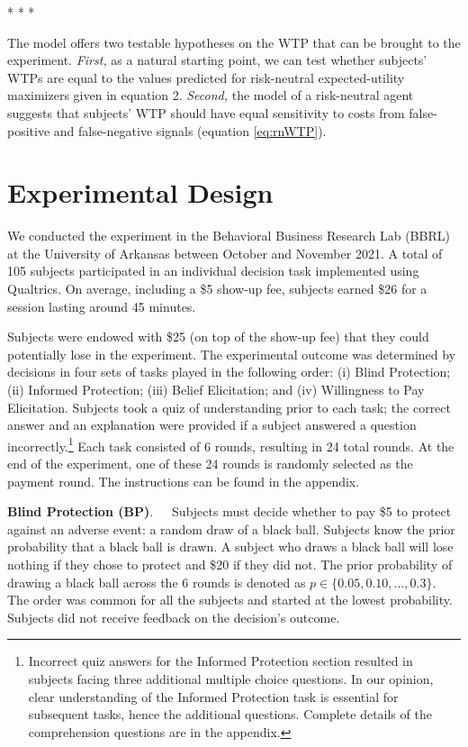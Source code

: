 \documentclass[12pt,a4paper]{article}
\begin{document}
\begin{center} * * * \end{center}
The model offers two testable hypotheses on the WTP that can be brought to the experiment. \emph{First,} as a natural starting point, we can test whether subjects' WTPs are equal to the values predicted for risk-neutral expected-utility maximizers given in equation 2. \emph{Second,} the model of a risk-neutral agent suggests that subjects' WTP should have equal sensitivity to costs from false-positive and false-negative signals (equation \ref{eq:rnWTP}). 



\section{Experimental Design}\label{sec:design}

We conducted the experiment in the Behavioral Business Research Lab (BBRL) at the University of Arkansas between October and November 2021.  A total of 105 subjects participated in an individual decision task implemented using Qualtrics.  On average, including a \$5 show-up fee, subjects earned \$26 for a session lasting around 45 minutes. 
 
Subjects were endowed with \$25 (on top of the show-up fee) that they could potentially lose in the experiment. The experimental outcome was determined by decisions in four sets of tasks played in the following order: (i) Blind Protection; (ii) Informed Protection; (iii) Belief Elicitation; and (iv) Willingness to Pay Elicitation. Subjects took a quiz of understanding prior to each task; the correct answer and an explanation were provided if a subject answered a question incorrectly.\footnote{Incorrect quiz answers for the Informed Protection section resulted in subjects facing three additional multiple choice questions. In our opinion, clear understanding of the Informed Protection task is essential for subsequent tasks, hence the additional questions. Complete details of the comprehension questions are in the appendix.} Each task consisted of 6 rounds, resulting in 24 total rounds. At the end of the experiment, one of these 24 rounds is randomly selected as the payment round. The instructions can be found in the appendix.


\bigskip
\noindent\textbf{Blind Protection (BP)}.\ \ \ Subjects must decide whether to pay \$5 to protect against an adverse event: a random draw of a black ball.  Subjects know the prior probability that a black ball is drawn. A subject who draws a black ball will lose nothing if they chose to protect and \$20 if they did not. The prior probability of drawing a black ball across the 6 rounds is denoted as $p \in \{0.05,0.10,...,0.3\}$. The order was common for all the subjects and started at the lowest probability. Subjects did not receive feedback on the decision's outcome.
\end{document}
